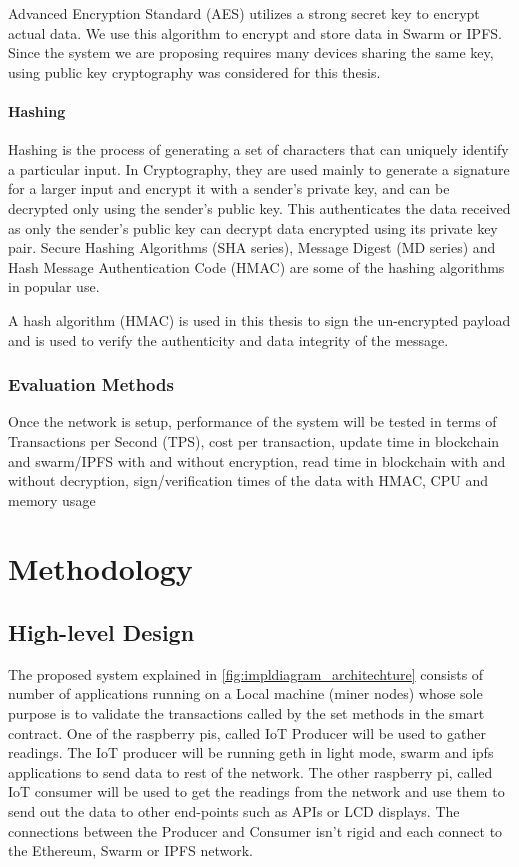 \documentclass[11pt,openright]{report}
\begin{document}
Advanced Encryption Standard (AES) utilizes a strong secret key to encrypt actual data. We use this algorithm to encrypt and store data in Swarm or IPFS. Since the system we are proposing requires many devices sharing the same key, using public key cryptography was considered for this thesis.  
\subsubsection{Hashing}
Hashing is the process of generating a set of characters that can uniquely identify a particular input. In Cryptography, they are used mainly to generate a signature for a larger input and encrypt it with a sender's private key, and can be decrypted only using the sender's public key. This authenticates the data received as only the sender's public key can decrypt data encrypted using its private key pair. Secure Hashing Algorithms (SHA series), Message Digest (MD series) and Hash Message Authentication Code (HMAC) are some of the hashing algorithms in popular use.

A hash algorithm (HMAC) is used in this thesis to sign the un-encrypted payload and is used to verify the authenticity and data integrity of the message. 

\subsection{Evaluation Methods}
Once the network is setup, performance of the system will be tested in terms of Transactions per Second (TPS), cost per transaction, update time in blockchain and swarm/IPFS with and without encryption, read time in blockchain with and without decryption, sign/verification times of the data with HMAC, CPU and memory usage

\chapter{Methodology} \label{chapter:proposed_system}

\section{High-level Design} \label{ss:construct_architecture}
The proposed system explained in \ref{fig:impldiagram_architechture} consists of number of applications running on a Local machine (miner nodes) whose sole purpose is to validate the transactions called by the set methods in the smart contract. One of the raspberry pis, called IoT Producer will be used to gather readings. The IoT producer will be running geth in light mode, swarm and ipfs applications to send data to rest of the network. The other raspberry pi, called IoT consumer will be used to get the readings from the network and use them to send out the data to other end-points such as APIs or LCD displays. The connections between the Producer and Consumer isn't rigid and each connect to the Ethereum, Swarm or IPFS network.
\end{document}
